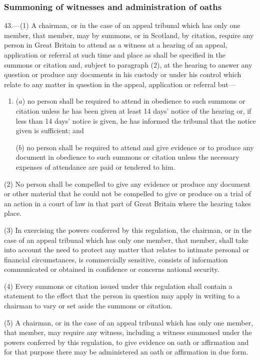 \documentclass[12pt,a4paper]{article}
\begin{document}
\subsubsection[43. Summoning of witnesses and administration of oaths]{Summoning of witnesses and administration of oaths}

43.—(1) A chairman, or in the case of an appeal tribunal which has only one member, that member, may by summons, or in Scotland, by citation, require any person in Great Britain to attend as a witness at a hearing of an appeal, application or referral at such time and place as shall be specified in the summons or citation and, subject to paragraph (2), at the hearing to answer any question or produce any documents in his custody or under his control which relate to any matter in question in the appeal, application or referral but—
\begin{enumerate}\item[]
($a$) no person shall be required to attend in obedience to such summons or citation unless he has been given at least 14 days' notice of the hearing or, if less than 14 days' notice is given, he has informed the tribunal that the notice given is sufficient; and

($b$) no person shall be required to attend and give evidence or to produce any document in obedience to such summons or citation unless the necessary expenses of attendance are paid or tendered to him.
\end{enumerate}

(2) No person shall be compelled to give any evidence or produce any document or other material that he could not be compelled to give or produce on a trial of an action in a court of law in that part of Great Britain where the hearing takes place.

(3) In exercising the powers conferred by this regulation, the chairman, or in the case of an appeal tribunal which has only one member, that member, shall take into account the need to protect any matter that relates to intimate personal or financial circumstances, is commercially sensitive, consists of information communicated or obtained in confidence or concerns national security.

(4) Every summons or citation issued under this regulation shall contain a statement to the effect that the person in question may apply in writing to a chairman to vary or set aside the summons or citation.

(5) A chairman, or in the case of an appeal tribunal which has only one member, that member, may require any witness, including a witness summoned under the powers conferred by this regulation, to give evidence on oath or affirmation and for that purpose there may be administered an oath or affirmation in due form.
\end{document}
